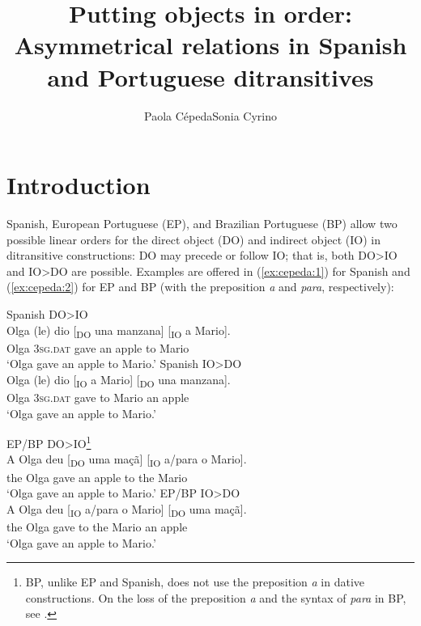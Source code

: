 \documentclass[output=paper,colorlinks,citecolor=brown,modfonts,nonflat]{langsci/langscibook}
\author{Paola Cépeda\affiliation{Stony Brook University}\lastand Sonia Cyrino\affiliation{University of Campinas}}
\title{Putting objects in order: Asymmetrical relations in Spanish and Portuguese ditransitives}
\begin{document}
\maketitle
{}

\section{Introduction}\label{sec:cepeda:1}

Spanish, European Portuguese (EP), and Brazilian Portuguese (BP) allow two possible linear orders for the direct object (DO) and indirect object (IO) in ditransitive constructions: DO may precede or follow IO; that is, both DO>IO and IO>DO are possible. Examples are offered in (\ref{ex:cepeda:1}) for Spanish and (\ref{ex:cepeda:2}) for EP and BP (with the preposition \textit{a} and \textit{para}, respectively):

\ea%
    \label{ex:cepeda:1}
	\ea\label{ex:cepeda:1a}
	Spanish DO>IO\\
	\gll Olga (le) dio [\textsubscript{DO} una manzana] [\textsubscript{IO} a  Mario]. \\
		Olga \textsc{3sg.dat} gave \hspaceThis{[\textsubscript{DO}} an apple \hspaceThis{[\textsubscript{IO}} to Mario \\
	\glt ‘Olga gave an apple to Mario.'
	\ex\label{ex:cepeda:1b}Spanish IO>DO\\
		\gll Olga (le) dio [\textsubscript{IO} a  Mario] [\textsubscript{DO} una manzana]. \\
			Olga \textsc{3sg.dat} gave \hspaceThis{[\textsubscript{IO}} to Mario \hspaceThis{[\textsubscript{DO}} an   apple\\
		\glt ‘Olga gave an apple to Mario.’
	\z
\z

\ea%
    \label{ex:cepeda:2}
	\ea\label{ex:cepeda:2a}
	EP/BP DO>IO\footnote{BP, unlike EP and Spanish, does not use the preposition \textit{a} in dative constructions. On the loss of the preposition \textit{a} and the syntax of \textit{para} in BP, see .}\\
	\gll A Olga  deu [\textsubscript{DO} uma maçã] [\textsubscript{IO} a/para  o  Mario].\\
		the Olga gave  \hspaceThis{[\textsubscript{DO}} an   apple \hspaceThis{[\textsubscript{IO}} to the Mario \\
	\glt ‘Olga gave an apple to Mario.’
	\ex\label{ex:cepeda:2b}EP/BP IO>DO\\
	\gll A Olga  deu [\textsubscript{IO} a/para  o  Mario] [\textsubscript{DO} uma maçã]. \\
		the Olga gave \hspaceThis{[\textsubscript{IO}} to the Mario \hspaceThis{[\textsubscript{DO}} an apple \\
	\glt ‘Olga gave an apple to Mario.’
	\z
\z
\end{document}
